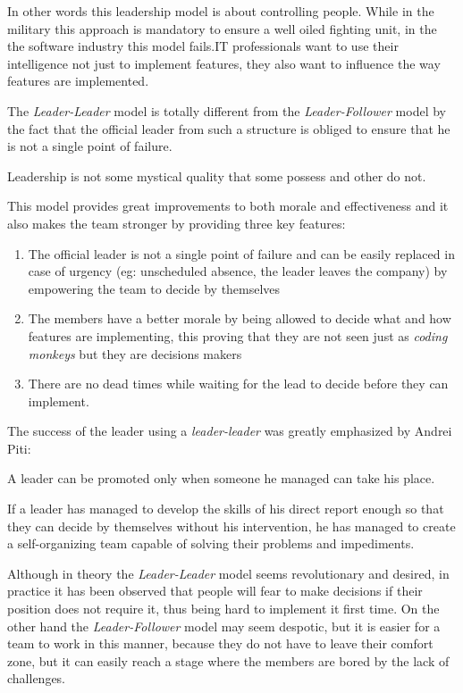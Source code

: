 In other words this leadership model is about controlling people. While in the military this approach is mandatory to ensure a well oiled fighting unit, in the the software industry this model fails.IT professionals want to use their intelligence not just to implement features, they also want to influence the way features are implemented.

The \textit{Leader-Leader} model is totally different from the \textit{Leader-Follower} model by the fact that the official leader from such a structure is obliged to ensure that he is not a single point of failure.

Leadership is not some mystical quality that some possess and other do not.\cite{turn-that-ship-around}

This model provides great improvements to both morale and effectiveness and it also makes the team stronger by providing three key features:
\begin{enumerate}
\item The official leader is not a single point of failure and can be easily replaced in case of urgency (eg: unscheduled absence, the leader leaves the company) by empowering the team to decide by themselves
\item The members have a better morale by being allowed to decide what and how features are implementing, this proving that they are not seen just as \textit{coding monkeys} but they are decisions makers
\item There are no dead times while waiting for the lead to decide before they can implement.
\end{enumerate}

The success of the leader using a \textit{leader-leader} was greatly emphasized by Andrei Piti:

\begin{displayquote}
A leader can be promoted only when someone he managed can take his place.
\end{displayquote}

If a leader has managed to develop the skills of his direct report enough so that they can decide by themselves without his intervention, he has managed to create a self-organizing team capable of solving their problems and impediments.

Although in theory the \textit{Leader-Leader} model seems revolutionary and desired, in practice it has been observed that people will fear to make decisions if their position does not require it, thus being hard to implement it first time. On the other hand the \textit{Leader-Follower} model may seem despotic, but it is easier for a team to work in this manner, because they do not have to leave their comfort zone, but it can easily reach a stage where the members are bored by the lack of challenges.

